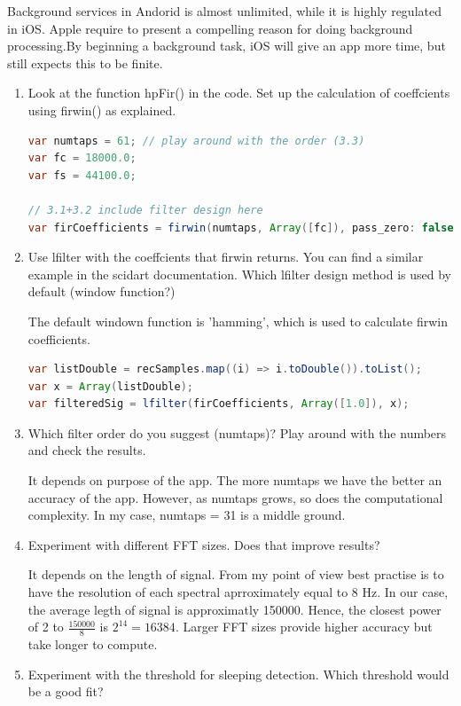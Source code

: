\documentclass{homework}
\begin{document}
\begin{enumerate}
	Background services in Andorid is almost unlimited, while it is highly regulated in iOS. Apple require to present a compelling reason for doing background processing.By beginning a background task, iOS will give an app more time, but still expects this to be finite. 
	
\end{enumerate}
\exercise
\begin{enumerate}
\item Look at the function hpFir() in the code. Set up the calculation of coeffcients using firwin() as explained.
	\begin{lstlisting}[language=Java, caption=FIR coefficients calculation in .dart file]
var numtaps = 61; // play around with the order (3.3)
var fc = 18000.0;
var fs = 44100.0;

// 3.1+3.2 include filter design here
var firCoefficients = firwin(numtaps, Array([fc]), pass_zero: false, fs: fs);
	\end{lstlisting}
\item Use lfilter with the coeffcients that firwin returns. You can find a similar example in the scidart documentation. Which lfilter design method is used by default (window function?)

The default windown function is 'hamming', which is used to calculate firwin coefficients.
	\begin{lstlisting}[language=Java, caption=FIR in .dart file]
var listDouble = recSamples.map((i) => i.toDouble()).toList();
var x = Array(listDouble);
var filteredSig = lfilter(firCoefficients, Array([1.0]), x);
	\end{lstlisting}

\item Which filter order do you suggest (numtaps)? Play around with the numbers and check the results.

It depends on purpose of the app. The more numtaps we have the better an accuracy of the app. However, as numtaps grows, so does the computational complexity. In my case, numtaps = 31 is a middle ground. 

\item Experiment with different FFT sizes. Does that improve results?

It depends on the length of signal. From my point of view best practise is to have the resolution of each spectral aprroximately equal to 8 Hz. In our case, the average legth of signal is approximatly 150000. Hence, the closest power of 2 to $\frac{150000}{8}$ is $2^{14} = 16384$. Larger FFT sizes provide higher accuracy but take longer to compute.
\item Experiment with the threshold for sleeping detection. Which threshold would be a good fit?


\end{enumerate}
\end{document}
